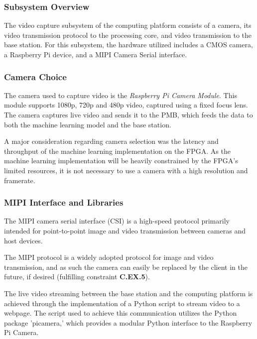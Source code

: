 
\subsubsection{Subsystem Overview}
The video capture subsystem of the computing platform consists of a camera, its video transmission protocol to the processing core, and video transmission to the base station. For this subsystem, the hardware utilized includes a CMOS camera, a Raspberry Pi device, and a MIPI Camera Serial interface. 

\subsubsection{Camera Choice}
The camera used to capture video is the \textit{Raspberry Pi Camera Module}. This module supports 1080p, 720p and 480p video, captured using a fixed focus lens. The camera captures live video and sends it to the PMB, which feeds the data to both the machine learning model and the base station.

A major consideration regarding camera selection was the latency and throughput of the machine learning implementation on the FPGA. As the machine learning implementation will be heavily constrained by the FPGA's limited resources, it is not necessary to use a camera with a high resolution and framerate.

\subsubsection{MIPI Interface and Libraries}
The MIPI camera serial interface (CSI) is a high-speed protocol primarily intended for point-to-point image and video transmission between cameras and host devices. 

The MIPI protocol is a widely adopted protocol for image and video transmission, and as such the camera can easily be replaced by the client in the future, if desired (fulfilling constraint \textbf{C.EX.5}).

The live video streaming between the base station and the computing platform is achieved through the implementation of a Python script to stream video to a webpage. The script used to achieve this communication utilizes the Python package 'picamera,' which provides a modular Python interface to the Raspberry Pi Camera.

